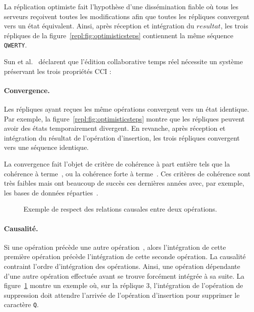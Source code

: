\noindent La réplication optimiste fait l'hypothèse d'une dissémination fiable
où tous les serveurs reçoivent toutes les modifications afin que toutes les
répliques convergent vers un état équivalent. Ainsi, après réception et
intégration du $resultat$, les trois répliques de la
figure~\ref{repl:fig:optimisticsteps} contiennent la même séquence
\texttt{QWERTY}.

Sun et al.~\cite{sun1998achieving} déclarent que l'édition collaborative temps
réel nécessite un système préservant les trois propriétés CCI :

\paragraph{Convergence.} Les répliques ayant reçues les même opérations
convergent vers un état identique. Par exemple, la
figure~\ref{repl:fig:optimisticsteps} montre que les répliques peuvent avoir des
états temporairement divergent. En revanche, après réception et intégration du
résultat de l'opération d'insertion, les trois répliques convergent vers une
séquence identique.

\noindent La convergence fait l'objet de critère de cohérence à part entière
tels que la cohérence à terme~\cite{bailis2013eventual}, ou la cohérence forte à
terme~\cite{shapiro2011conflict}. Ces critères de cohérence sont très faibles
mais ont beaucoup de succès ces dernières années avec, par exemple, les bases de
données réparties~\cite{dynamo, riak, cassandra, mongodb}.

\begin{figure}
  \begin{center}
    
    \caption[Exemple de respect des relations
    causales]{\label{repl:fig:causality}Exemple de respect des relations
      causales entre deux opérations.}
  \end{center}
\end{figure}

\paragraph{Causalité.} Si une opération précède une autre
opération~\cite{lamport1978time}, alors l'intégration de cette première
opération précède l'intégration de cette seconde opération.  La causalité
contraint l'ordre d'intégration des opérations. Ainsi, une opération dépendante
d'une autre opération effectuée avant se trouve forcément intégrée à sa suite.
La figure~\ref{repl:fig:causality} montre un exemple où, sur la réplique 3,
l'intégration de l'opération de suppression doit attendre l'arrivée de
l'opération d'insertion pour supprimer le caractère \texttt{Q}.


